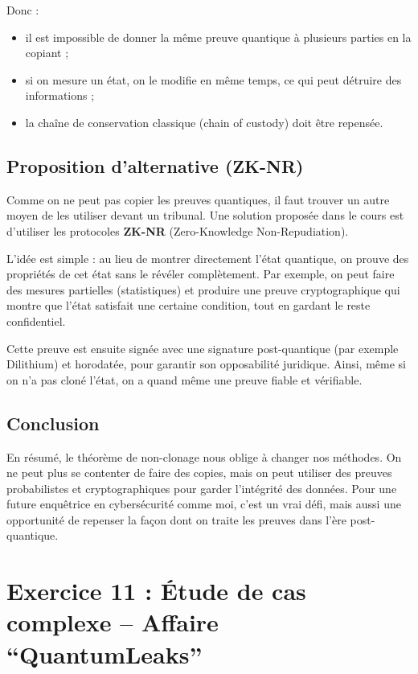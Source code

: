 \documentclass[12pt,a4paper]{report}
\begin{document}
	Donc :
	\begin{itemize}
		\item il est impossible de donner la même preuve quantique à plusieurs parties en 
		la copiant ;
		\item si on mesure un état, on le modifie en même temps, ce qui peut détruire des 
		informations ;
		\item la chaîne de conservation classique (chain of custody) doit être repensée.
	\end{itemize}
	
	\subsection*{Proposition d’alternative (ZK-NR)}
	
	Comme on ne peut pas copier les preuves quantiques, il faut trouver un autre moyen 
	de les utiliser devant un tribunal. Une solution proposée dans le cours est d’utiliser 
	les protocoles \textbf{ZK-NR} (Zero-Knowledge Non-Repudiation).  
	
	L’idée est simple : au lieu de montrer directement l’état quantique, on prouve des 
	propriétés de cet état sans le révéler complètement. Par exemple, on peut faire des 
	mesures partielles (statistiques) et produire une preuve cryptographique qui montre 
	que l’état satisfait une certaine condition, tout en gardant le reste confidentiel.  
	
	Cette preuve est ensuite signée avec une signature post-quantique (par exemple Dilithium) 
	et horodatée, pour garantir son opposabilité juridique. Ainsi, même si on n’a pas cloné 
	l’état, on a quand même une preuve fiable et vérifiable.
	
	\subsection*{Conclusion}
	
	En résumé, le théorème de non-clonage nous oblige à changer nos méthodes. On ne peut plus 
	se contenter de faire des copies, mais on peut utiliser des preuves probabilistes et 
	cryptographiques pour garder l’intégrité des données. Pour une future enquêtrice en 
	cybersécurité comme moi, c’est un vrai défi, mais aussi une opportunité de repenser la 
	façon dont on traite les preuves dans l’ère post-quantique.
	
	\section*{Exercice 11 : Étude de cas complexe – Affaire ``QuantumLeaks''}
	
\end{document}
